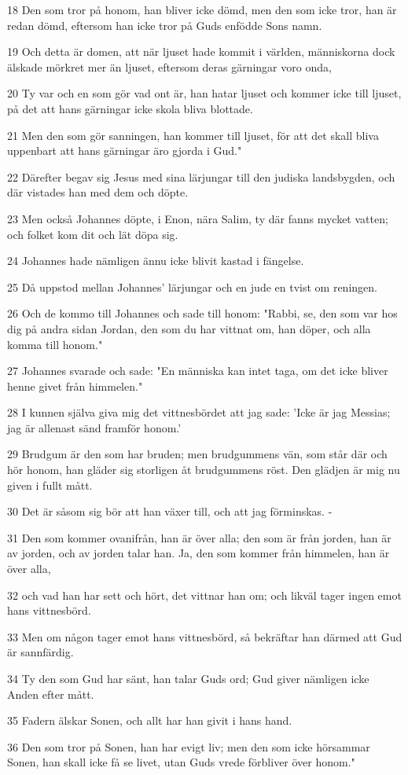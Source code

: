 \par 18 Den som tror på honom, han bliver icke dömd, men den som icke tror, han är redan dömd, eftersom han icke tror på Guds enfödde Sons namn.
\par 19 Och detta är domen, att när ljuset hade kommit i världen, människorna dock älskade mörkret mer än ljuset, eftersom deras gärningar voro onda,
\par 20 Ty var och en som gör vad ont är, han hatar ljuset och kommer icke till ljuset, på det att hans gärningar icke skola bliva blottade.
\par 21 Men den som gör sanningen, han kommer till ljuset, för att det skall bliva uppenbart att hans gärningar äro gjorda i Gud."
\par 22 Därefter begav sig Jesus med sina lärjungar till den judiska landsbygden, och där vistades han med dem och döpte.
\par 23 Men också Johannes döpte, i Enon, nära Salim, ty där fanns mycket vatten; och folket kom dit och lät döpa sig.
\par 24 Johannes hade nämligen ännu icke blivit kastad i fängelse.
\par 25 Då uppstod mellan Johannes' lärjungar och en jude en tvist om reningen.
\par 26 Och de kommo till Johannes och sade till honom: "Rabbi, se, den som var hos dig på andra sidan Jordan, den som du har vittnat om, han döper, och alla komma till honom."
\par 27 Johannes svarade och sade: "En människa kan intet taga, om det icke bliver henne givet från himmelen."
\par 28 I kunnen själva giva mig det vittnesbördet att jag sade: 'Icke är jag Messias; jag är allenast sänd framför honom.'
\par 29 Brudgum är den som har bruden; men brudgummens vän, som står där och hör honom, han gläder sig storligen åt brudgummens röst. Den glädjen är mig nu given i fullt mått.
\par 30 Det är såsom sig bör att han växer till, och att jag förminskas. -
\par 31 Den som kommer ovanifrån, han är över alla; den som är från jorden, han är av jorden, och av jorden talar han. Ja, den som kommer från himmelen, han är över alla,
\par 32 och vad han har sett och hört, det vittnar han om; och likväl tager ingen emot hans vittnesbörd.
\par 33 Men om någon tager emot hans vittnesbörd, så bekräftar han därmed att Gud är sannfärdig.
\par 34 Ty den som Gud har sänt, han talar Guds ord; Gud giver nämligen icke Anden efter mått.
\par 35 Fadern älskar Sonen, och allt har han givit i hans hand.
\par 36 Den som tror på Sonen, han har evigt liv; men den som icke hörsammar Sonen, han skall icke få se livet, utan Guds vrede förbliver över honom."


